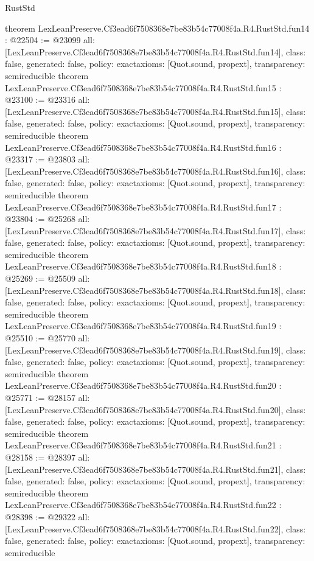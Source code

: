 \begin{lexlean}{RustStd}
\begin{coremodule}
{}
theorem LexLeanPreserve.Cf3ead6f7508368e7be83b54c77008f4a.R4.RustStd.fun14 : @22504 := @23099 {
  all: [LexLeanPreserve.Cf3ead6f7508368e7be83b54c77008f4a.R4.RustStd.fun14],
  class: false,
  generated: false,
  policy: exact{axioms: [Quot.sound, propext]},
  transparency: semireducible
}
theorem LexLeanPreserve.Cf3ead6f7508368e7be83b54c77008f4a.R4.RustStd.fun15 : @23100 := @23316 {
  all: [LexLeanPreserve.Cf3ead6f7508368e7be83b54c77008f4a.R4.RustStd.fun15],
  class: false,
  generated: false,
  policy: exact{axioms: [Quot.sound, propext]},
  transparency: semireducible
}
theorem LexLeanPreserve.Cf3ead6f7508368e7be83b54c77008f4a.R4.RustStd.fun16 : @23317 := @23803 {
  all: [LexLeanPreserve.Cf3ead6f7508368e7be83b54c77008f4a.R4.RustStd.fun16],
  class: false,
  generated: false,
  policy: exact{axioms: [Quot.sound, propext]},
  transparency: semireducible
}
theorem LexLeanPreserve.Cf3ead6f7508368e7be83b54c77008f4a.R4.RustStd.fun17 : @23804 := @25268 {
  all: [LexLeanPreserve.Cf3ead6f7508368e7be83b54c77008f4a.R4.RustStd.fun17],
  class: false,
  generated: false,
  policy: exact{axioms: [Quot.sound, propext]},
  transparency: semireducible
}
theorem LexLeanPreserve.Cf3ead6f7508368e7be83b54c77008f4a.R4.RustStd.fun18 : @25269 := @25509 {
  all: [LexLeanPreserve.Cf3ead6f7508368e7be83b54c77008f4a.R4.RustStd.fun18],
  class: false,
  generated: false,
  policy: exact{axioms: [Quot.sound, propext]},
  transparency: semireducible
}
theorem LexLeanPreserve.Cf3ead6f7508368e7be83b54c77008f4a.R4.RustStd.fun19 : @25510 := @25770 {
  all: [LexLeanPreserve.Cf3ead6f7508368e7be83b54c77008f4a.R4.RustStd.fun19],
  class: false,
  generated: false,
  policy: exact{axioms: [Quot.sound, propext]},
  transparency: semireducible
}
theorem LexLeanPreserve.Cf3ead6f7508368e7be83b54c77008f4a.R4.RustStd.fun20 : @25771 := @28157 {
  all: [LexLeanPreserve.Cf3ead6f7508368e7be83b54c77008f4a.R4.RustStd.fun20],
  class: false,
  generated: false,
  policy: exact{axioms: [Quot.sound, propext]},
  transparency: semireducible
}
theorem LexLeanPreserve.Cf3ead6f7508368e7be83b54c77008f4a.R4.RustStd.fun21 : @28158 := @28397 {
  all: [LexLeanPreserve.Cf3ead6f7508368e7be83b54c77008f4a.R4.RustStd.fun21],
  class: false,
  generated: false,
  policy: exact{axioms: [Quot.sound, propext]},
  transparency: semireducible
}
theorem LexLeanPreserve.Cf3ead6f7508368e7be83b54c77008f4a.R4.RustStd.fun22 : @28398 := @29322 {
  all: [LexLeanPreserve.Cf3ead6f7508368e7be83b54c77008f4a.R4.RustStd.fun22],
  class: false,
  generated: false,
  policy: exact{axioms: [Quot.sound, propext]},
  transparency: semireducible
}
\end{coremodule}
\end{lexlean}
